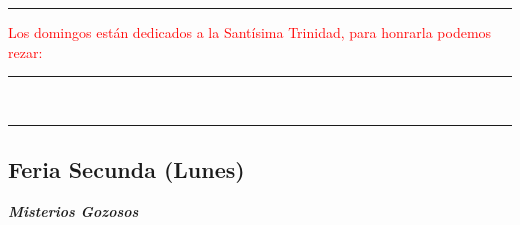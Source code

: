 \documentclass[10pt,twoside]{book}
\begin{document}




\vspace{0.75em}





\vspace{0.75em}





\vspace{0.75em}





\iralfinal

\begin{center}
      {\rule{10em}{0.4pt}}

      \vspace{0.75em}

      \textcolor{red}{Los domingos están dedicados a la Santísima Trinidad, para honrarla podemos rezar:}
\end{center}

\begin{multicols}{2}

      
      
\end{multicols}

\begin{center}
      \begin{spacing}{0.25}
            {\rule{20em}{0.4pt}}\\
            {\rule{20em}{0.4pt}}
      \end{spacing}
\end{center}


\begin{center}
      \section*{Feria Secunda (Lunes)}

      \textbf{\textsl{\large Misterios Gozosos}}
\end{center}
\end{document}
